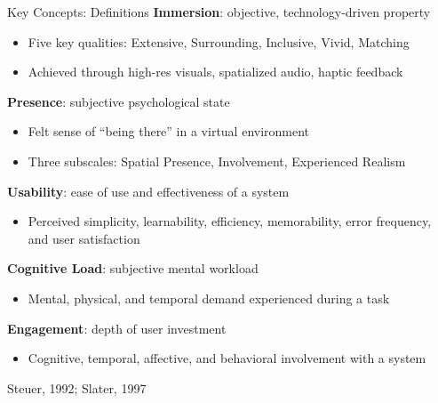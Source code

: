 \documentclass[aspectratio=169, 12pt]{beamer}
\newcommand{\citefooter}[1]{\hfill{\tiny #1}}
\begin{document}

\begin{frame}{Key Concepts: Definitions}
	\textbf{\textcolor{gbAqua}{Immersion}}: objective, technology-driven property
	\begin{itemize}
		\item Five key qualities: Extensive, Surrounding, Inclusive, Vivid, Matching
		\item Achieved through high-res visuals, spatialized audio, haptic feedback
	\end{itemize}

	\vspace{0.18cm}
	\textbf{\textcolor{gbAqua}{Presence}}: subjective psychological state
	\begin{itemize}
		\item Felt sense of ``being there'' in a virtual environment
		\item Three subscales: Spatial Presence, Involvement, Experienced Realism
	\end{itemize}

	\vspace{0.18cm}
	\textbf{\textcolor{gbAqua}{Usability}}: ease of use and effectiveness of a system
	\begin{itemize}
		\item Perceived simplicity, learnability, efficiency, memorability, error frequency, and user satisfaction 
	\end{itemize}

	\vspace{0.18cm}
	\textbf{\textcolor{gbAqua}{Cognitive Load}}: subjective mental workload
	\begin{itemize}
		\item Mental, physical, and temporal demand experienced during a task
	\end{itemize}

	\vspace{0.18cm}
	\textbf{\textcolor{gbAqua}{Engagement}}: depth of user investment
	\begin{itemize}
		\item Cognitive, temporal, affective, and behavioral involvement with a system
	\end{itemize}

	\citefooter{Steuer, 1992; Slater, 1997}
\end{frame}
\end{document}
